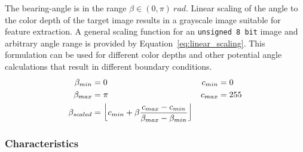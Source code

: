 The \Gls{bearing-angle} is in the range $\beta \in (0, \pi)~rad$.
Linear scaling of the angle to the color depth of the target image results in a grayscale image suitable for feature extraction.
A general scaling function for an \texttt{unsigned 8\,bit} image and arbitrary angle range is provided by Equation~\ref{eq:linear_scaling}.
This formulation can be used for different color depths and other potential angle calculations that result in different boundary conditions.
\begin{equation}
\begin{aligned}
\label{eq:linear_scaling}
    \beta_{min} &= 0 ~& c_{min} &= 0 \\
    \beta_{max} &= \pi ~& c_{max} &= 255 \\
    \beta_{scaled} &= \floor*{c_{min} + \beta \frac{c_{max} - c_{min}}{\beta_{max} - \beta_{min}}}
\end{aligned}
\end{equation}

\subsubsection*{Characteristics}


